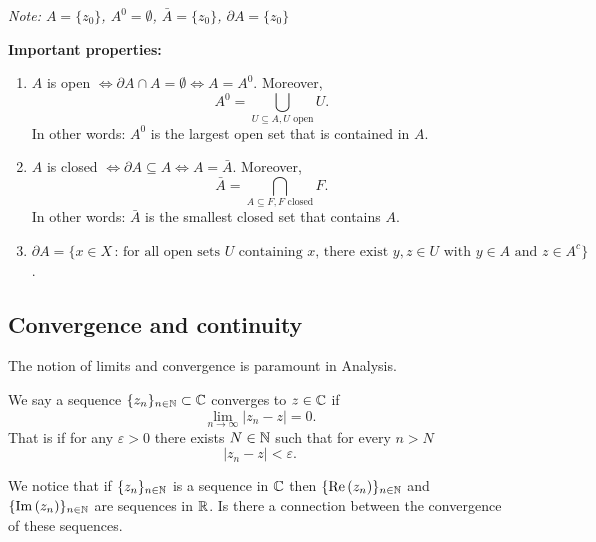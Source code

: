 \documentclass[10pt, a4paper]{article}
\begin{document}
\textit{Note:
$A = \{z_0\}$,
$A ^ 0 = \emptyset$,
$\bar{A} = \{z_0\}$,
$\partial A = \{z_0\}$}

\textbf{Important properties:}
\begin{enumerate}[label = (\roman*)]
    \item $A$ is open $\iff \partial A \cap A = \emptyset \iff A = A ^ 0$.
    Moreover,
    \[
    A ^ 0 = \bigcup_{U \subseteq A, U\text{ open}}U.
    \]
    In other words:
    $A ^ 0$ is the largest open set that is contained in $A$.

    \item $A$ is closed $\iff \partial A \subseteq A \iff A = \bar{A}$.
    Moreover,
    \[
    \bar{A} = \bigcap_{A \subseteq F, F\text{ closed}}F.
    \]
    In other words:
    $\bar{A}$ is the smallest closed set that contains $A$.

    \item $\partial A = \{x \in X\,:\,\text{for all open sets $U$ containing $x$,
    there exist $y, z \in U$ with $y \in A$ and $z \in A ^ c$}\}$.
\end{enumerate}

\subsection{Convergence and continuity}

The notion of limits and convergence is paramount in Analysis.

\begin{definition}
    We say a sequence $\{z_n\}_{n \in \mathbb{N}} \subset \mathbb{C}$ converges to $z \in \mathbb{C}$ if
    \[
    \lim_{n \to \infty}|z_n - z| = 0.
    \]
    That is if for any $\varepsilon > 0$ there exists $N \in \mathbb{N}$ such that for every $n > N$
    \[
    |z_n - z| < \varepsilon.
    \]
\end{definition}

We notice that if $\{z_n\}_{n \in \mathbb{N}}$ is a sequence in $\mathbb{C}$ then $\{\mathrm{Re}\,(z_n)\}_{n \in \mathbb{N}}$ and $\{\mathrm{Im}\,(z_n)\}_{n \in \mathbb{N}}$ are sequences in $\mathbb{R}$.
Is there a connection between the convergence of these sequences.
\end{document}
